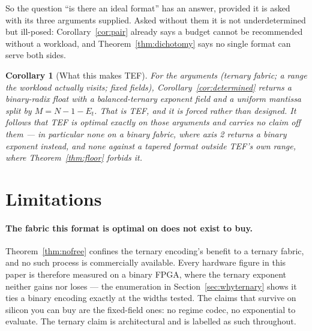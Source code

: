 \documentclass[11pt]{article}
\newtheorem{corollary}{Corollary}
\theoremstyle{definition}
\begin{document}
So the question ``is there an ideal format'' has an answer, provided it is asked
with its three arguments supplied. Asked without them it is not underdetermined
but ill-posed: Corollary~\ref{cor:pair} already says a budget cannot be
recommended without a workload, and Theorem~\ref{thm:dichotomy} says no single
format can serve both sides.

\begin{corollary}[What this makes TEF]
\label{cor:whatitmakes}
For the arguments (ternary fabric; a range the workload actually visits; fixed
fields), Corollary~\ref{cor:determined} returns a binary-radix float with a
balanced-ternary exponent field and a uniform mantissa split by
$M = N - 1 - E_t$. That is TEF, and it is forced rather than designed. It follows
that TEF is optimal exactly on those arguments and carries no claim off them ---
in particular none on a binary fabric, where axis 2 returns a binary exponent
instead, and none against a tapered format outside TEF's own range, where
Theorem~\ref{thm:floor} forbids it.
\end{corollary}

\section{Limitations}

\paragraph{The fabric this format is optimal on does not exist to buy.}
Theorem~\ref{thm:nofree} confines the ternary encoding's benefit to a ternary
fabric, and no such process is commercially available. Every hardware figure in
this paper is therefore measured on a binary FPGA, where the ternary exponent
neither gains nor loses --- the enumeration in Section~\ref{sec:whyternary} shows
it ties a binary encoding exactly at the widths tested. The claims that survive on
silicon you can buy are the fixed-field ones: no regime codec, no exponential to
evaluate. The ternary claim is architectural and is labelled as such throughout.
\label{sec:limits}
\end{document}
